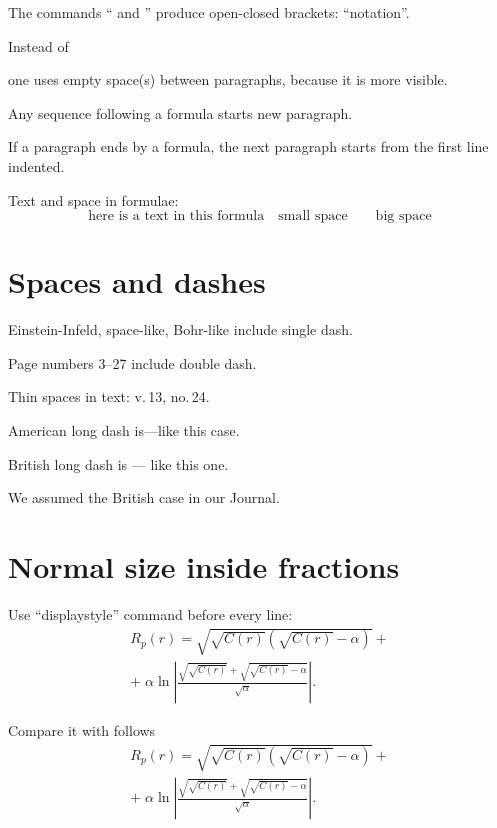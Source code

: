 \documentclass[twoside,final]{article}
\begin{document}
{The commands `` and '' produce open-closed brackets: ``notation''.

Instead of \par one uses empty space(s) between paragraphs, because it is more visible.

Any sequence following a formula starts new paragraph.

If a paragraph ends by a formula, the next paragraph starts from the first line indented.

Text and space in formulae:
$$
\mbox{here is a text in this formula}\quad
\mbox{small space}\qquad \mbox{big space}
$$


\section{Spaces and dashes}


Einstein-Infeld, space-like, Bohr-like include single dash.

Page numbers 3--27 include double dash.

Thin spaces in text: v.\,13, no.\,24.

American long dash is---like this case.

British long dash is --- like this one.

We assumed the British case in our Journal.



\section{Normal size inside fractions}


Use ``displaystyle'' command before every line:
\begin{equation}
\begin{array}{ll}
\displaystyle
R_{p}(r) = \sqrt{\sqrt{C(r)}\left(\sqrt{C(r)} - \alpha\right)} + \\[+12pt]
\displaystyle
+ \;\alpha\ln\left|\frac{\sqrt{\sqrt{C(r)}} + \sqrt{\sqrt{C(r)} - 
\alpha}}{\sqrt{\alpha}}\right|.
\end{array}
\end{equation}

Compare it with follows
\begin{equation}
\begin{array}{ll}
R_{p}(r) = \sqrt{\sqrt{C(r)}\left(\sqrt{C(r)} - \alpha\right)} + \\[+12pt]
+ \;\alpha\ln\left|\frac{\sqrt{\sqrt{C(r)}} + \sqrt{\sqrt{C(r)} - 
\alpha}}{\sqrt{\alpha}}\right|.
\end{array}
\end{equation}




}
\end{document}
